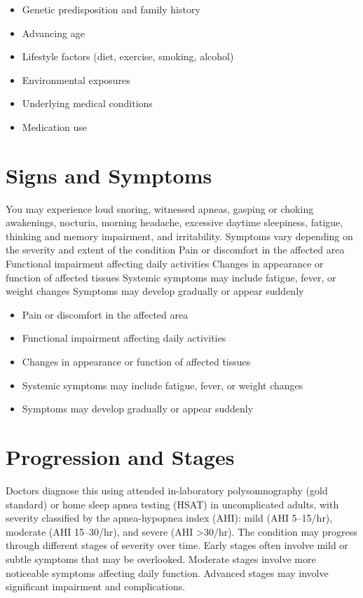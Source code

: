 \begin{itemize}[noitemsep]
  \item Genetic predisposition and family history
  \item Advancing age
  \item Lifestyle factors (diet, exercise, smoking, alcohol)
  \item Environmental exposures
  \item Underlying medical conditions
  \item Medication use
\end{itemize}
\section{Signs and Symptoms}
You may experience loud snoring, witnessed apneas, gasping or choking awakenings, nocturia, morning headache, excessive daytime sleepiness, fatigue, thinking and memory impairment, and irritability. Symptoms vary depending on the severity and extent of the condition Pain or discomfort in the affected area Functional impairment affecting daily activities Changes in appearance or function of affected tissues Systemic symptoms may include fatigue, fever, or weight changes Symptoms may develop gradually or appear suddenly

\begin{itemize}[noitemsep]
  \item Pain or discomfort in the affected area
  \item Functional impairment affecting daily activities
  \item Changes in appearance or function of affected tissues
  \item Systemic symptoms may include fatigue, fever, or weight changes
  \item Symptoms may develop gradually or appear suddenly
\end{itemize}
\section{Progression and Stages}
Doctors diagnose this using attended in-laboratory polysomnography (gold standard) or home sleep apnea testing (HSAT) in uncomplicated adults, with severity classified by the apnea-hypopnea index (AHI): mild (AHI 5--15/hr), moderate (AHI 15--30/hr), and severe (AHI >30/hr). The condition may progress through different stages of severity over time. Early stages often involve mild or subtle symptoms that may be overlooked. Moderate stages involve more noticeable symptoms affecting daily function. Advanced stages may involve significant impairment and complications.
